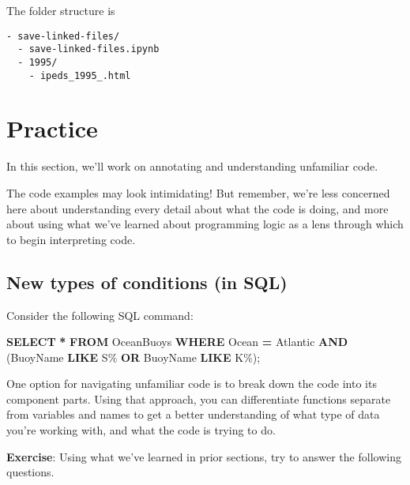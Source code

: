 \documentclass[
]{book}
\newenvironment{Shaded}{\begin{snugshade}}{\end{snugshade}}
\newcommand{\KeywordTok}[1]{\textcolor[rgb]{0.13,0.29,0.53}{\textbf{#1}}}
\newcommand{\NormalTok}[1]{#1}
\newcommand{\OperatorTok}[1]{\textcolor[rgb]{0.81,0.36,0.00}{\textbf{#1}}}
\newcommand{\StringTok}[1]{\textcolor[rgb]{0.31,0.60,0.02}{#1}}
\begin{document}
The folder structure is

\begin{verbatim}
- save-linked-files/
  - save-linked-files.ipynb
  - 1995/
    - ipeds_1995_.html
\end{verbatim}

\chapter{Practice}\label{practice-2}

In this section, we'll work on annotating and understanding unfamiliar code.

The code examples may look intimidating! But remember, we're less concerned here about understanding every detail about what the code is doing, and more about using what we've learned about programming logic as a lens through which to begin interpreting code.

\section{New types of conditions (in SQL)}\label{new-types-of-conditions-in-sql}

Consider the following SQL command:

\begin{Shaded}
\begin{Highlighting}[]
\KeywordTok{SELECT} \OperatorTok{*} \KeywordTok{FROM}\NormalTok{ OceanBuoys}
\KeywordTok{WHERE}\NormalTok{ Ocean }\OperatorTok{=} \StringTok{\textquotesingle{}Atlantic\textquotesingle{}} \KeywordTok{AND}\NormalTok{ (BuoyName }\KeywordTok{LIKE} \StringTok{\textquotesingle{}S\%\textquotesingle{}} \KeywordTok{OR}\NormalTok{ BuoyName }\KeywordTok{LIKE} \StringTok{\textquotesingle{}K\%\textquotesingle{}}\NormalTok{);}
\end{Highlighting}
\end{Shaded}

One option for navigating unfamiliar code is to break down the code into its
component parts. Using that approach, you can differentiate functions separate from variables and names to get a better understanding of what type of data you're working with, and what the code is trying to do.

\textbf{Exercise}: Using what we've learned in prior sections, try to answer the following questions.
\end{document}
